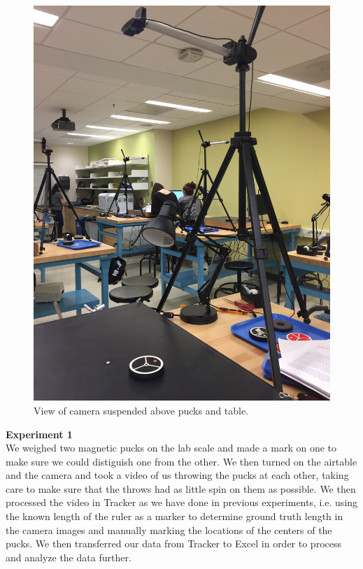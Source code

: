 \documentclass[11pt]{article}
\begin{document}
\begin{figure}[!h]
     \includegraphics{camera.JPG}
     \caption{View of camera suspended above pucks and table.}
     \label{cam}
\end{figure}

{\bf Experiment 1}\\

We weighed two magnetic pucks on the lab scale and made a mark on one to make sure we could distiguish one from the other. We then turned on the airtable and the camera and took a video of us throwing the pucks at each other, taking care to make sure that the throws had as little spin on them as possible. We then processed the video in Tracker as we have done in previous experiments, i.e. using the known length of the ruler as a marker to determine ground truth length in the camera images and manually marking the locations of the centers of the pucks. We then transferred our data from Tracker to Excel in order to process and analyze the data further.\\
\end{document}
